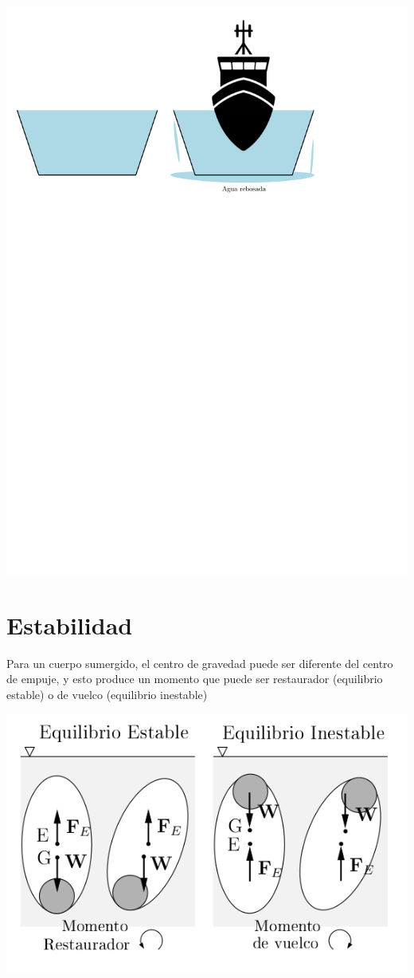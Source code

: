 	\begin{center}
		\includegraphics[width=0.75\columnwidth]{TeX_files/chapter02-Hidrostatica/arquimedes1}
	\end{center}


\section{Estabilidad}

Para un cuerpo sumergido, el centro de gravedad puede ser diferente del centro de empuje, y esto produce un momento que puede ser restaurador (equilibrio estable) o de vuelco (equilibrio inestable)

\begin{center}
	\includegraphics[width=0.7\linewidth]{TeX_files/chapter02-Hidrostatica/estabilidad1}
\end{center}

